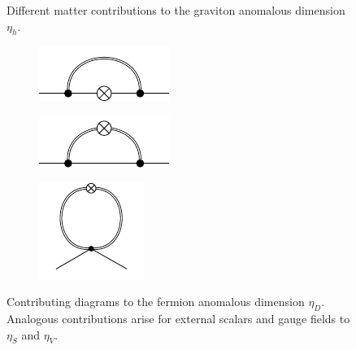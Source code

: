 \begin{figure}[t]
\begin{subfigure}{0.3\textwidth}
 \end{subfigure} 
 \hfill
 \caption{Different matter contributions to the graviton anomalous dimension $\eta_h$.}	
 \end{figure}
 
 \blindtext
 
  \begin{figure}[t]
 \centering
 \hfill
 \begin{subfigure}{0.3\textwidth} 
	\includegraphics[width=\textwidth]{figs/TikZ/graviton_fluctuations1}
 \end{subfigure}
 \hfill
 \begin{subfigure}{0.3\textwidth}
 \vspace{-3.5pt}
 	\includegraphics[width=\textwidth]{figs/TikZ/graviton_fluctuations2}
 \end{subfigure} 
 \hfill
 \begin{subfigure}{0.3\textwidth} 
 	\includegraphics[scale = 1.5]{figs/TikZ/graviton_fluctuations3}
 \end{subfigure} 
 \hfill
 \caption[Contributing diagrams to the fermion anomalous dimension $\eta_D$.]{Contributing diagrams to the fermion anomalous dimension $\eta_D$. Analogous contributions arise for external scalars and gauge fields to $\eta_S$ and $\eta_V$.} 	
 \end{figure}